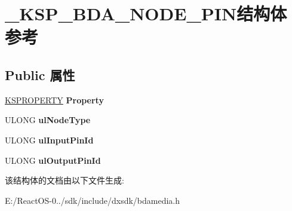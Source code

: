 \hypertarget{struct___k_s_p___b_d_a___n_o_d_e___p_i_n}{}\section{\+\_\+\+K\+S\+P\+\_\+\+B\+D\+A\+\_\+\+N\+O\+D\+E\+\_\+\+P\+I\+N结构体 参考}
\label{struct___k_s_p___b_d_a___n_o_d_e___p_i_n}
\subsection*{Public 属性}
\begin{DoxyCompactItemize}
\item 
\mbox{\label{struct___k_s_p___b_d_a___n_o_d_e___p_i_n_a37bca36a9a1de18873e5174ce063f9a8}} 
\hyperlink{struct_k_s_i_d_e_n_t_i_f_i_e_r}{K\+S\+P\+R\+O\+P\+E\+R\+TY} {\bfseries Property}
\item 
\mbox{\label{struct___k_s_p___b_d_a___n_o_d_e___p_i_n_af5bba7e8bc1357a54760a6a6619544ab}} 
U\+L\+O\+NG {\bfseries ul\+Node\+Type}
\item 
\mbox{\label{struct___k_s_p___b_d_a___n_o_d_e___p_i_n_a4afaa895632d0f0d7feafd258a8b78b3}} 
U\+L\+O\+NG {\bfseries ul\+Input\+Pin\+Id}
\item 
\mbox{\label{struct___k_s_p___b_d_a___n_o_d_e___p_i_n_a949f59b50071880cf4102a150a6a8a75}} 
U\+L\+O\+NG {\bfseries ul\+Output\+Pin\+Id}
\end{DoxyCompactItemize}


该结构体的文档由以下文件生成\+:\begin{DoxyCompactItemize}
\item 
E\+:/\+React\+O\+S-\/0../sdk/include/dxsdk/bdamedia.\+h\end{DoxyCompactItemize}

